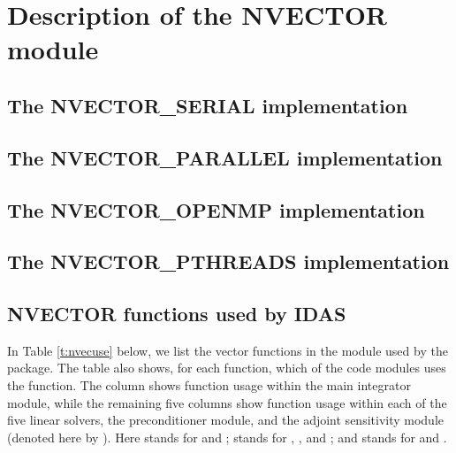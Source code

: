 \chapter{Description of the NVECTOR module}\label{s:nvector}


\section{The NVECTOR\_SERIAL implementation}\label{ss:nvec_ser}


\section{The NVECTOR\_PARALLEL implementation}\label{ss:nvec_par}


\section{The NVECTOR\_OPENMP implementation}\label{ss:nvec_openmp}


\section{The NVECTOR\_PTHREADS implementation}\label{ss:nvec_pthreads}


\section{NVECTOR functions used by IDAS}

In Table \ref{t:nvecuse} below, we list the vector functions in the 
{\nvector} module used by the {\idas} package.
The table also shows, for each function, which of the code modules uses
the function. The {\idas} column shows function usage within the main
integrator module, while the remaining five columns show function usage
within each of the five {\idas} linear solvers, the {\idabbdpre}
preconditioner module, and the {\idas} adjoint sensitivity module
(denoted here by {\idaa}).
Here {\idadls} stands for {\idadense} and {\idaband}; {\idaspils} stands
for {\idaspgmr}, {\idaspbcg}, and {\idasptfqmr}; and {\idasls}
stands for {\idaklu} and {\idasuperlumt}.

